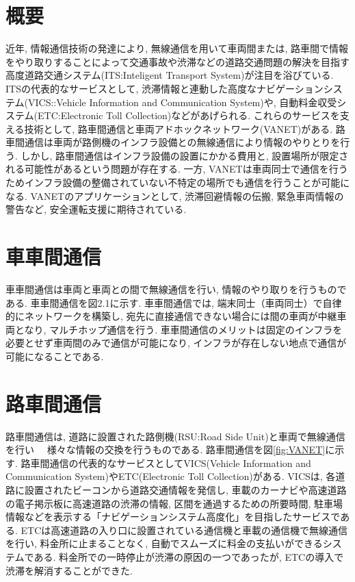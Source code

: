 \documentclass[10pt]{jreport}
\begin{document}
\section{概要}
近年, 情報通信技術の発達により, 無線通信を用いて車両間または, 路車間で情報をやり取りすることによって交通事故や渋滞などの道路交通問題の解決を目指す高度道路交通システム(ITS:Inteligent Transport System)が注目を浴びている\cite{sample7}. ITSの代表的なサービスとして, 渋滞情報と連動した高度なナビゲーションシステム(VICS::Vehicle Information and Communication System)\cite{sample8}や, 自動料金収受システム(ETC:Electronic Toll Collection)\cite{sample9}などがあげられる. これらのサービスを支える技術として, 路車間通信と車両アドホックネットワーク(VANET)がある. 路車間通信は車両が路側機のインフラ設備との無線通信により情報のやりとりを行う. しかし, 路車間通信はインフラ設備の設置にかかる費用と, 設置場所が限定される可能性があるという問題が存在する. 一方, VANETは車両同士で通信を行うためインフラ設備の整備されていない不特定の場所でも通信を行うことが可能になる. VANETのアプリケーションとして, 渋滞回避情報の伝搬, 緊急車両情報の警告など, 安全運転支援に期待されている. 
\section{車車間通信}
車車間通信は車両と車両との間で無線通信を行い, 情報のやり取りを行うものである. 車車間通信を図2.1に示す. 車車間通信では, 端末同士（車両同士）で自律的にネットワークを構築し, 宛先に直接通信できない場合には間の車両が中継車両となり, マルチホップ通信を行う. 車車間通信のメリットは固定のインフラを必要とせず車両間のみで通信が可能になり, インフラが存在しない地点で通信が可能になることである. 
\section{路車間通信}
路車間通信は, 道路に設置された路側機(RSU:Road Side Unit)と車両で無線通信を行い　
様々な情報の交換を行うものである. 路車間通信を図\ref{fig:VANET}に示す.  路車間通信の代表的なサービスとしてVICS(Vehicle Information and Communication System)やETC(Electronic Toll Collection)がある. VICSは, 各道路に設置されたビーコンから道路交通情報を発信し, 車載のカーナビや高速道路の電子掲示板に高速道路の渋滞の情報, 区間を通過するための所要時間, 駐車場情報などを表示する「ナビゲーションシステム高度化」を目指したサービスである. ETCは高速道路の入り口に設置されている通信機と車載の通信機で無線通信を行い, 料金所に止まることなく, 自動でスムーズに料金の支払いができるシステムである. 料金所での一時停止が渋滞の原因の一つであったが, ETCの導入で渋滞を解消することができた. 
\end{document}
